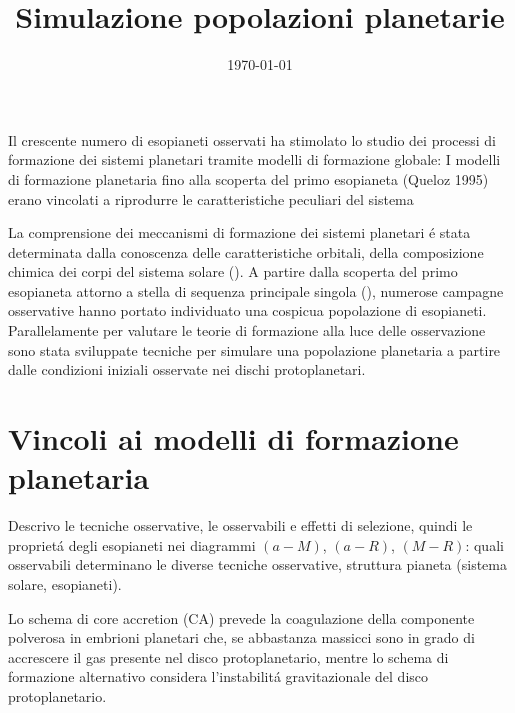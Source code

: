 \documentclass[twoside,11pt,fleqn]{memoir}%
\author{ }
\title{Simulazione popolazioni planetarie}
\date{\today}
\begin{document}
\maketitle
{}
\tableofcontents*
\mainmatter
{}
\cleartorecto

\begin{errata}
Il crescente numero di esopianeti osservati ha stimolato lo studio dei processi di formazione dei sistemi planetari tramite modelli di formazione globale: 
I modelli di formazione planetaria fino alla scoperta del primo esopianeta (Queloz 1995) erano vincolati a riprodurre le caratteristiche peculiari del sistema
\end{errata}
La comprensione dei meccanismi di formazione dei sistemi planetari \'e stata determinata dalla conoscenza delle caratteristiche orbitali, della composizione chimica dei corpi del sistema solare (\cite{lissauer1993planet}). A partire dalla scoperta del primo esopianeta attorno a stella di sequenza principale singola (\cite{mayor1995jupiter}), numerose campagne osservative hanno portato individuato una cospicua popolazione di esopianeti. Parallelamente per valutare le teorie di formazione alla luce delle osservazione sono stata sviluppate tecniche per simulare una popolazione planetaria a partire dalle condizioni iniziali osservate nei dischi protoplanetari.

{\let\clearpage\relax\let\cleardoublepage\relax
\part{Vincoli ai modelli di formazione planetaria}
}
\begin{errata}
Descrivo le tecniche osservative, le osservabili e effetti di selezione, quindi le propriet\'a degli esopianeti nei diagrammi $(a-M)$, $(a-R)$, $(M-R)$: quali osservabili determinano le diverse tecniche osservative, struttura pianeta (sistema solare, esopianeti).
\end{errata}
Lo schema di core accretion (CA) prevede la coagulazione della componente polverosa in embrioni planetari che, se abbastanza massicci sono in grado di accrescere il gas presente nel disco protoplanetario, mentre lo schema di formazione alternativo considera l'instabilit\'a gravitazionale del disco protoplanetario.
\end{document}
